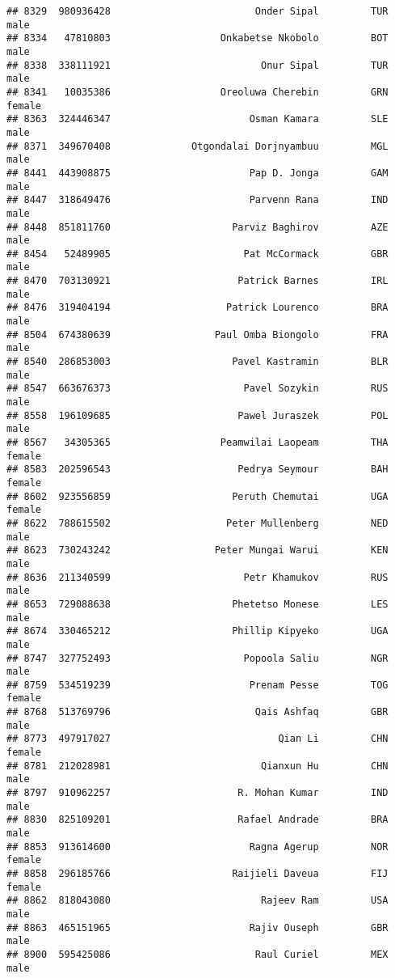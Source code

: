 \documentclass[]{article}
\begin{document}
\begin{verbatim}
## 8329  980936428                         Onder Sipal         TUR   male
## 8334   47810803                   Onkabetse Nkobolo         BOT   male
## 8338  338111921                          Onur Sipal         TUR   male
## 8341   10035386                   Oreoluwa Cherebin         GRN female
## 8363  324446347                        Osman Kamara         SLE   male
## 8371  349670408              Otgondalai Dorjnyambuu         MGL   male
## 8441  443908875                        Pap D. Jonga         GAM   male
## 8447  318649476                        Parvenn Rana         IND   male
## 8448  851811760                     Parviz Baghirov         AZE   male
## 8454   52489905                       Pat McCormack         GBR   male
## 8470  703130921                      Patrick Barnes         IRL   male
## 8476  319404194                    Patrick Lourenco         BRA   male
## 8504  674380639                  Paul Omba Biongolo         FRA   male
## 8540  286853003                     Pavel Kastramin         BLR   male
## 8547  663676373                       Pavel Sozykin         RUS   male
## 8558  196109685                      Pawel Juraszek         POL   male
## 8567   34305365                   Peamwilai Laopeam         THA female
## 8583  202596543                      Pedrya Seymour         BAH female
## 8602  923556859                     Peruth Chemutai         UGA female
## 8622  788615502                    Peter Mullenberg         NED   male
## 8623  730243242                  Peter Mungai Warui         KEN   male
## 8636  211340599                       Petr Khamukov         RUS   male
## 8653  729088638                     Phetetso Monese         LES   male
## 8674  330465212                     Phillip Kipyeko         UGA   male
## 8747  327752493                       Popoola Saliu         NGR   male
## 8759  534519239                        Prenam Pesse         TOG female
## 8768  513769796                         Qais Ashfaq         GBR   male
## 8773  497917027                             Qian Li         CHN female
## 8781  212028981                          Qianxun Hu         CHN   male
## 8797  910962257                      R. Mohan Kumar         IND   male
## 8830  825109201                      Rafael Andrade         BRA   male
## 8853  913614600                        Ragna Agerup         NOR female
## 8858  296185766                     Raijieli Daveua         FIJ female
## 8862  818043080                          Rajeev Ram         USA   male
## 8863  465151965                        Rajiv Ouseph         GBR   male
## 8900  595425086                         Raul Curiel         MEX   male

\end{verbatim}
\end{document}
